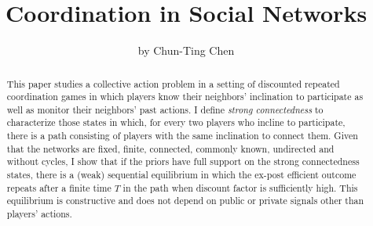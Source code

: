 \documentclass[12pt,letter]{article}
\theoremstyle{definition}
\theoremstyle{remark}
\theoremstyle{claim}
\begin{document}

\title {Coordination in Social Networks}
\author {by Chun-Ting Chen}

\maketitle

\begin{abstract}

This paper studies a collective action problem in a setting of discounted repeated coordination games in which players know their neighbors'  inclination to participate as well as monitor their neighbors' past actions. I define \textit{strong connectedness} to characterize those states in which, for every two players who incline to participate, there is a path consisting of players with the same inclination to connect them.  Given that the networks are fixed, finite, connected, commonly known, undirected and without cycles, I show that if the priors have full support on the strong connectedness states, there is a (weak) sequential equilibrium in which the ex-post efficient outcome repeats after a finite time $T$ in the path when discount factor is sufficiently high. This equilibrium is constructive and does not depend on public or private signals other than players' actions.




\end{abstract}
\end{document}
